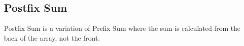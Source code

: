 \subsection*{Postfix Sum}
    Postfix Sum is a variation of Prefix Sum where the sum is calculated from the back of the array, not the front.
